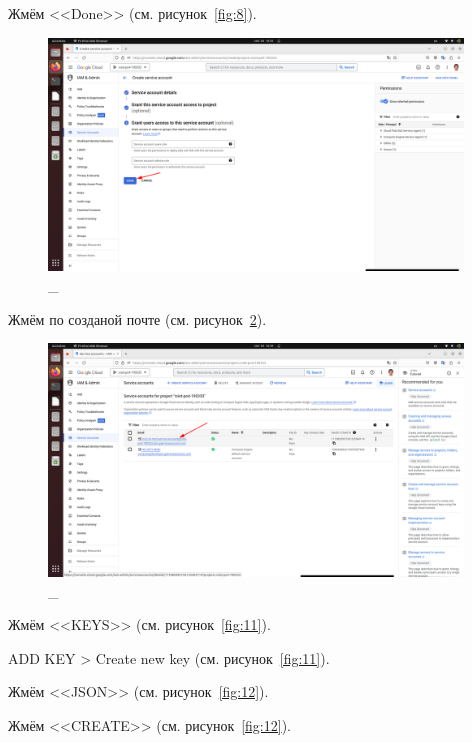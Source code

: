 \documentclass[12pt, a4paper, simple]{eskdtext}
\begin{document}
  \newpage
  Жмём <<Done>> (см. рисунок~\ref{fig:8}).

  \begin{figure}[!h]
    \centering
    \includegraphics[width=11cm]
    {images/2023-02-26_16-56-00.png}
    \caption{\_}
    \label{fig:9}
  \end{figure}

  Жмём по созданой почте (см. рисунок~\ref{fig:10}).

  \begin{figure}[!h]
    \centering
    \includegraphics[width=11cm]
    {images/2023-02-26_16-59-46.png}
    \caption{\_}
    \label{fig:10}
  \end{figure}

  Жмём <<KEYS>> (см. рисунок~\ref{fig:11}).

  ADD KEY > Create new key (см. рисунок~\ref{fig:11}).

  Жмём <<JSON>> (см. рисунок~\ref{fig:12}).

  Жмём <<CREATE>> (см. рисунок~\ref{fig:12}).
\end{document}
